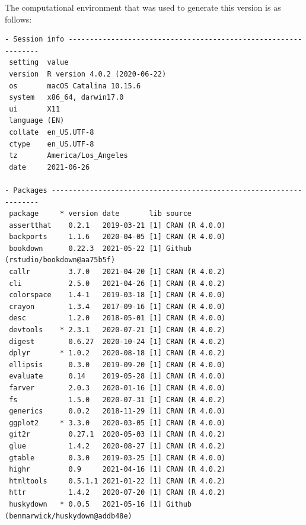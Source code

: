\documentclass [11pt, proquest] {uwthesis}[2015/03/03]
\begin{document}
The computational environment that was used to generate this version is
as follows:
\begin{verbatim}
- Session info ---------------------------------------------------------------
 setting  value                       
 version  R version 4.0.2 (2020-06-22)
 os       macOS Catalina 10.15.6      
 system   x86_64, darwin17.0          
 ui       X11                         
 language (EN)                        
 collate  en_US.UTF-8                 
 ctype    en_US.UTF-8                 
 tz       America/Los_Angeles         
 date     2021-06-26                  

- Packages -------------------------------------------------------------------
 package     * version date       lib source                               
 assertthat    0.2.1   2019-03-21 [1] CRAN (R 4.0.0)                       
 backports     1.1.6   2020-04-05 [1] CRAN (R 4.0.0)                       
 bookdown      0.22.3  2021-05-22 [1] Github (rstudio/bookdown@aa75b5f)    
 callr         3.7.0   2021-04-20 [1] CRAN (R 4.0.2)                       
 cli           2.5.0   2021-04-26 [1] CRAN (R 4.0.2)                       
 colorspace    1.4-1   2019-03-18 [1] CRAN (R 4.0.0)                       
 crayon        1.3.4   2017-09-16 [1] CRAN (R 4.0.0)                       
 desc          1.2.0   2018-05-01 [1] CRAN (R 4.0.0)                       
 devtools    * 2.3.1   2020-07-21 [1] CRAN (R 4.0.2)                       
 digest        0.6.27  2020-10-24 [1] CRAN (R 4.0.2)                       
 dplyr       * 1.0.2   2020-08-18 [1] CRAN (R 4.0.2)                       
 ellipsis      0.3.0   2019-09-20 [1] CRAN (R 4.0.0)                       
 evaluate      0.14    2019-05-28 [1] CRAN (R 4.0.0)                       
 farver        2.0.3   2020-01-16 [1] CRAN (R 4.0.0)                       
 fs            1.5.0   2020-07-31 [1] CRAN (R 4.0.2)                       
 generics      0.0.2   2018-11-29 [1] CRAN (R 4.0.0)                       
 ggplot2     * 3.3.0   2020-03-05 [1] CRAN (R 4.0.0)                       
 git2r         0.27.1  2020-05-03 [1] CRAN (R 4.0.2)                       
 glue          1.4.2   2020-08-27 [1] CRAN (R 4.0.2)                       
 gtable        0.3.0   2019-03-25 [1] CRAN (R 4.0.0)                       
 highr         0.9     2021-04-16 [1] CRAN (R 4.0.2)                       
 htmltools     0.5.1.1 2021-01-22 [1] CRAN (R 4.0.2)                       
 httr          1.4.2   2020-07-20 [1] CRAN (R 4.0.2)                       
 huskydown   * 0.0.5   2021-05-16 [1] Github (benmarwick/huskydown@addb48e)

\end{verbatim}
\end{document}
